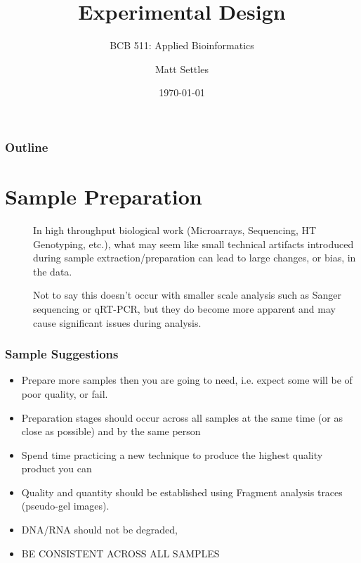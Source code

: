 \documentclass{beamer}
\title[Experimental Design]{Experimental Design}
\subtitle{BCB 511: Applied Bioinformatics\\}
\author[Matt Settles]{Matt Settles}
\institute{University of Idaho}
\date{\today}
\begin{document}
\begin{frame}[plain]
  \titlepage
\end{frame}


\begin{frame}[plain] 
  \frametitle{Outline}
  \tableofcontents
\end{frame}

\section{Sample Preparation}

\begin{frame}
\begin{description}
\item[] In high throughput biological work (Microarrays, Sequencing, HT Genotyping, etc.), what may seem like small technical artifacts introduced during sample extraction/preparation can lead to large changes, or bias, in the data.
\item[]
\item[] Not to say this doesn't occur with smaller scale analysis such as Sanger sequencing or qRT-PCR, but they do become more apparent and may cause significant issues during analysis.
\end{description}
\end{frame}


\begin{frame}
 \frametitle{Sample Suggestions}
\begin{itemize}
\item Prepare more samples then you are going to need, i.e. expect some will be of poor quality, or fail.
\item Preparation stages should occur across all samples at the same time (or as close as possible) and by the same person
\item Spend time practicing a new technique to produce the highest quality product you can
\item Quality and quantity should be established using Fragment analysis traces (pseudo-gel images).
\item DNA/RNA should not be degraded,
\item BE CONSISTENT ACROSS ALL SAMPLES
\end{itemize}

\end{frame}
\end{document}
